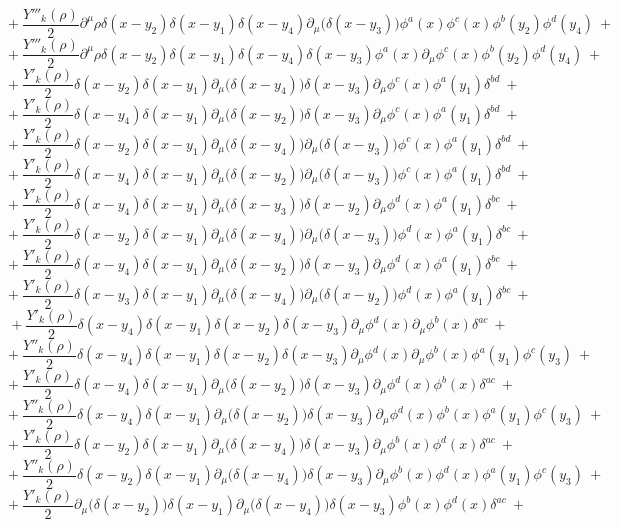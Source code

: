 $$+\ \frac{Y'''_k(\rho)}{2}\partial^\mu\rho\delta(x - y_2)\delta(x - y_1)\delta(x - y_4) \partial_\mu\big(\delta(x - y_3)\big)\phi^a(x)\phi^c(x)\phi^b(y_2)\phi^d(y_4) \ +$$
$$+\ \frac{Y'''_k(\rho)}{2}\partial^\mu\rho\delta(x - y_2)\delta(x - y_1)\delta(x - y_4) \delta(x - y_3)\phi^a(x)\partial_\mu\phi^c(x)\phi^b(y_2)\phi^d(y_4) \ +$$
$$+\ \frac{Y'_k(\rho)}{2}\delta(x - y_2)\delta(x - y_1)\partial_\mu\big(\delta(x - y_4)\big) \delta(x - y_3)\partial_\mu\phi^c(x)\phi^a(y_1)\delta^{bd} \ +$$
$$+\ \frac{Y'_k(\rho)}{2}\delta(x - y_4)\delta(x - y_1)\partial_\mu\big(\delta(x - y_2)\big) \delta(x - y_3)\partial_\mu\phi^c(x)\phi^a(y_1)\delta^{bd} \ +$$
$$+\ \frac{Y'_k(\rho)}{2}\delta(x - y_2)\delta(x - y_1)\partial_\mu\big(\delta(x - y_4)\big) \partial_\mu\big(\delta(x - y_3)\big)\phi^c(x)\phi^a(y_1)\delta^{bd} \ +$$
$$+\ \frac{Y'_k(\rho)}{2}\delta(x - y_4)\delta(x - y_1)\partial_\mu\big(\delta(x - y_2)\big) \partial_\mu\big(\delta(x - y_3)\big)\phi^c(x)\phi^a(y_1)\delta^{bd} \ +$$
$$+\ \frac{Y'_k(\rho)}{2}\delta(x - y_4)\delta(x - y_1)\partial_\mu\big(\delta(x - y_3)\big) \delta(x - y_2)\partial_\mu\phi^d(x)\phi^a(y_1)\delta^{bc} \ +$$
$$+\ \frac{Y'_k(\rho)}{2}\delta(x - y_2)\delta(x - y_1)\partial_\mu\big(\delta(x - y_4)\big) \partial_\mu\big(\delta(x - y_3)\big)\phi^d(x)\phi^a(y_1)\delta^{bc} \ +$$
$$+\ \frac{Y'_k(\rho)}{2}\delta(x - y_4)\delta(x - y_1)\partial_\mu\big(\delta(x - y_2)\big) \delta(x - y_3)\partial_\mu\phi^d(x)\phi^a(y_1)\delta^{bc} \ +$$
$$+\ \frac{Y'_k(\rho)}{2}\delta(x - y_3)\delta(x - y_1)\partial_\mu\big(\delta(x - y_4)\big) \partial_\mu\big(\delta(x - y_2)\big)\phi^d(x)\phi^a(y_1)\delta^{bc} \ +$$
$$+\ \frac{Y'_k(\rho)}{2}\delta(x - y_4)\delta(x - y_1)\delta(x - y_2)\delta(x - y_3)\partial_\mu\phi^d(x)\partial_\mu\phi^b(x)\delta^{ac} \ +$$
$$+\ \frac{Y''_k(\rho)}{2}\delta(x - y_4)\delta(x - y_1)\delta(x - y_2)\delta(x - y_3)\partial_\mu\phi^d(x)\partial_\mu\phi^b(x)\phi^a(y_1)\phi^c(y_3) \ +$$
$$+\ \frac{Y'_k(\rho)}{2}\delta(x - y_4)\delta(x - y_1)\partial_\mu\big(\delta(x - y_2)\big)\delta(x - y_3)\partial_\mu\phi^d(x)\phi^b(x)\delta^{ac} \ +$$
$$+\ \frac{Y''_k(\rho)}{2}\delta(x - y_4)\delta(x - y_1)\partial_\mu\big(\delta(x - y_2)\big)\delta(x - y_3)\partial_\mu\phi^d(x)\phi^b(x)\phi^a(y_1)\phi^c(y_3) \ +$$
$$+\ \frac{Y'_k(\rho)}{2}\delta(x - y_2)\delta(x - y_1)\partial_\mu\big(\delta(x - y_4)\big)\delta(x - y_3)\partial_\mu\phi^b(x)\phi^d(x)\delta^{ac} \ +$$
$$+\ \frac{Y''_k(\rho)}{2}\delta(x - y_2)\delta(x - y_1)\partial_\mu\big(\delta(x - y_4)\big)\delta(x - y_3)\partial_\mu\phi^b(x)\phi^d(x)\phi^a(y_1)\phi^c(y_3) \ +$$
$$+\ \frac{Y'_k(\rho)}{2}\partial_\mu\big(\delta(x - y_2)\big)\delta(x - y_1)\partial_\mu\big(\delta(x - y_4)\big)\delta(x - y_3)\phi^b(x)\phi^d(x)\delta^{ac} \ +$$
